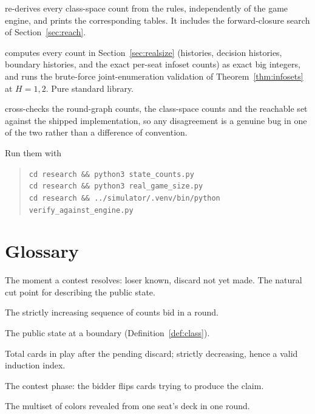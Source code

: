 \documentclass[11pt]{article}
\theoremstyle{plain}
\theoremstyle{definition}
\theoremstyle{remark}
\newcommand{\code}[1]{\texttt{\small #1}}
\begin{document}
\begin{description}\itemsep3pt
  \item[\code{state\_counts.py}] re-derives every class-space count from
        the rules, independently of the game engine, and prints the
        corresponding tables. It includes the forward-closure search of
        Section~\ref{sec:reach}.
  \item[\code{real\_game\_size.py}] computes every count in
        Section~\ref{sec:realsize} (histories, decision histories,
        boundary histories, and the exact per-seat infoset counts) as
        exact big integers, and runs the brute-force joint-enumeration
        validation of Theorem~\ref{thm:infosets} at $H=1,2$. Pure
        standard library.
  \item[\code{verify\_against\_engine.py}] cross-checks the round-graph
        counts, the class-space counts and the reachable set against the
        shipped implementation, so any disagreement is a genuine bug in one
        of the two rather than a difference of convention.
\end{description}

\noindent Run them with
\begin{quote}
\code{cd research \&\& python3 state\_counts.py}\\
\code{cd research \&\& python3 real\_game\_size.py}\\
\code{cd research \&\& ../simulator/.venv/bin/python verify\_against\_engine.py}
\end{quote}

\section{Glossary}

\begin{description}\itemsep2pt
  \item[Boundary] The moment a contest resolves: loser known, discard not
        yet made. The natural cut point for describing the public state.
  \item[Chain] The strictly increasing sequence of counts bid in a round.
  \item[Class] The public state at a boundary
        (Definition~\ref{def:class}).
  \item[Layer $T'$] Total cards in play after the pending discard; strictly
        decreasing, hence a valid induction index.
  \item[Procurement] The contest phase: the bidder flips cards trying to
        produce the claim.
  \item[Sighting] The multiset of colors revealed from one seat's deck in
        one round.
\end{description}
\end{document}
